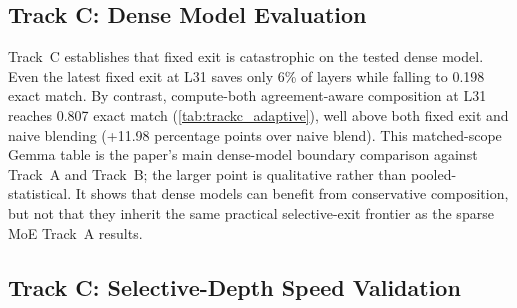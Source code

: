 \documentclass[11pt]{article}
\begin{document}
\subsection{Track C: Dense Model Evaluation}

\begin{table}[t]
\centering
\small
\caption{Track~C adaptive benchmark on Gemma~3 4B-IT, reported on the shared expository subset ($P2$--$P5$ scored after warmup).}
\label{tab:trackc_adaptive}
\end{table}

Track~C establishes that fixed exit is catastrophic on the tested dense model. Even the latest fixed exit at L31 saves only 6\% of layers while falling to 0.198 exact match. By contrast, compute-both agreement-aware composition at L31 reaches 0.807 exact match (\cref{tab:trackc_adaptive}), well above both fixed exit and naive blending (+11.98 percentage points over naive blend). This matched-scope Gemma table is the paper's main dense-model boundary comparison against Track~A and Track~B; the larger point is qualitative rather than pooled-statistical. It shows that dense models can benefit from conservative composition, but not that they inherit the same practical selective-exit frontier as the sparse MoE Track~A results.

\subsection{Track C: Selective-Depth Speed Validation}
\end{document}
